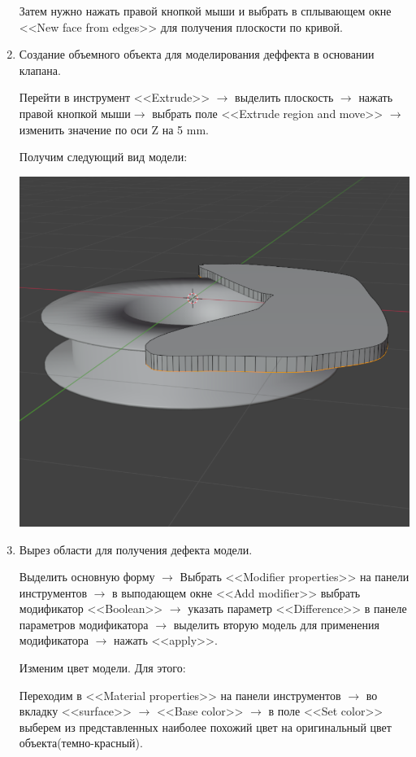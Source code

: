 \documentclass[12pt]{article}
\begin{document}
\begin{enumerate}
Затем нужно нажать правой кнопкой мыши и выбрать в сплывающем окне <<New face from edges>> для получения плоскости по кривой.

\item Создание объемного объекта для моделирования деффекта в основании клапана.

Перейти в инструмент <<Extrude>>  $\to $ выделить плоскость $\to $ нажать правой кнопкой мыши$\to $ выбрать поле <<Extrude region and move>> $\to $ изменить значение по оси Z на 5 mm.


Получим следующий вид модели:

\vskip 1cm
{
    \centering
    \includegraphics[width=1\linewidth]{2форма_с_диф.png}
    \label{fig:i1}
}
\vskip 1cm
	
\item Вырез области для получения дефекта модели.

Выделить основную форму $\to $ Выбрать <<Modifier properties>> на панели инструментов $\to $ в выподающем окне <<Add modifier>>  выбрать модификатор <<Boolean>> $\to $ указать параметр <<Difference>> в панеле параметров модификатора $\to $ выделить вторую модель для применения модификатора $\to $ нажать <<apply>>.

Изменим цвет модели. Для этого:


Переходим в <<Material properties>> на панели инструментов $\to $ во вкладку <<surface>> $\to $ <<Base color>> $\to $   в поле <<Set color>> выберем из представленных наиболее похожий цвет на оригинальный цвет объекта(темно-красный).



\end{enumerate}
\end{document}
